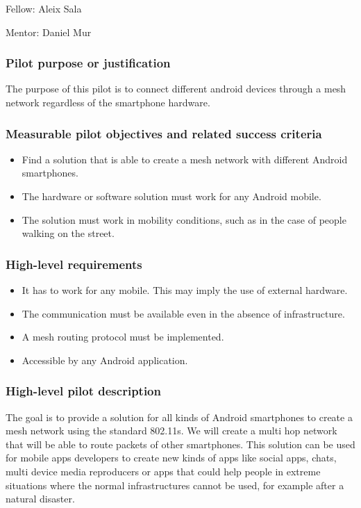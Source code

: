 \documentclass[draftclsnofoot,12pt,journal,onecolumn]{IEEEtran}
\begin{document}
Fellow: Aleix Sala

Mentor: Daniel Mur

\subsubsection{Pilot purpose or justification}
The purpose of this pilot is to connect different android devices through a mesh network regardless of the smartphone hardware.

\subsubsection{Measurable pilot objectives and related success criteria}
\begin{itemize}
\item Find a solution that is able to create a mesh network with different Android smartphones.
\item The hardware or software solution must work for any Android mobile.
\item The solution must work in mobility conditions, such as in the case of people walking on the street.
\end{itemize}

\subsubsection{High-level requirements}
\begin{itemize}
\item It has to work for any mobile. This may imply the use of external hardware.
\item The communication must be available even in the absence of infrastructure.
\item A mesh routing protocol must be implemented.
\item Accessible by any Android application.
\end{itemize}

\subsubsection{High-level pilot description}
The goal is to provide a solution for all kinds of Android smartphones to create a mesh network using the standard 802.11s. We will create a multi hop network that will be able to route packets of other smartphones.
This solution can be used for mobile apps developers to create new kinds of apps like social apps, chats, multi device media reproducers or apps that could help people in extreme situations where the normal infrastructures cannot be used, for example after a natural disaster.
\end{document}
